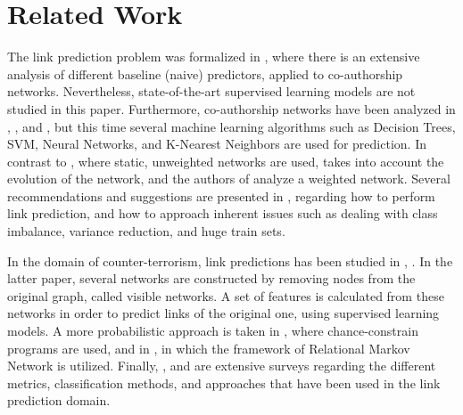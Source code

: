 \documentclass{acm_proc_article-sp}
\begin{document}
\section{Related Work}
\label{Sect.3}

The link prediction problem was formalized in \cite{Liben-Nowell:2003:LPP:956863.956972}, where there is an extensive analysis of different baseline (naive) predictors, applied to co-authorship networks. Nevertheless, state-of-the-art supervised learning models are not studied in this paper. Furthermore, co-authorship networks have been analyzed in \cite{Hasan06linkprediction}, \cite{Pavlov:2007:FEL:2889513.2889517}, and \cite{de2011supervised}, but this time several machine learning algorithms such as Decision Trees, SVM, Neural Networks, and K-Nearest Neighbors are used for prediction. In contrast to \cite{Hasan06linkprediction}, where static, unweighted networks are used, \cite{Pavlov:2007:FEL:2889513.2889517} takes into account the evolution of the network, and the authors of \cite{de2011supervised} analyze a weighted network. Several recommendations and suggestions are presented in \cite{Lichtenwalter:2010:NPM:1835804.1835837}, regarding how to perform link prediction, and how to approach inherent issues such as dealing with class imbalance, variance reduction, and huge train sets. 

In the domain of counter-terrorism, link predictions has been studied in \cite{dombroski2003estimating}, \cite{Fire2013}. In the latter paper, several networks are constructed by removing nodes from the original graph, called visible networks. A set of features is calculated from these networks in order to predict links of the original one, using supervised learning models. A more probabilistic approach is taken in \cite{doppa:nips09-wkshp}, where chance-constrain programs are used, and in \cite{NIPS2003_2465}, in which the framework of Relational Markov Network is utilized. Finally, \cite{DBLP:journals/corr/WangXWZ14}, and \cite{Hasan2011} are extensive surveys regarding the different metrics, classification methods, and approaches that have been used in the link prediction domain. 

\end{document}

